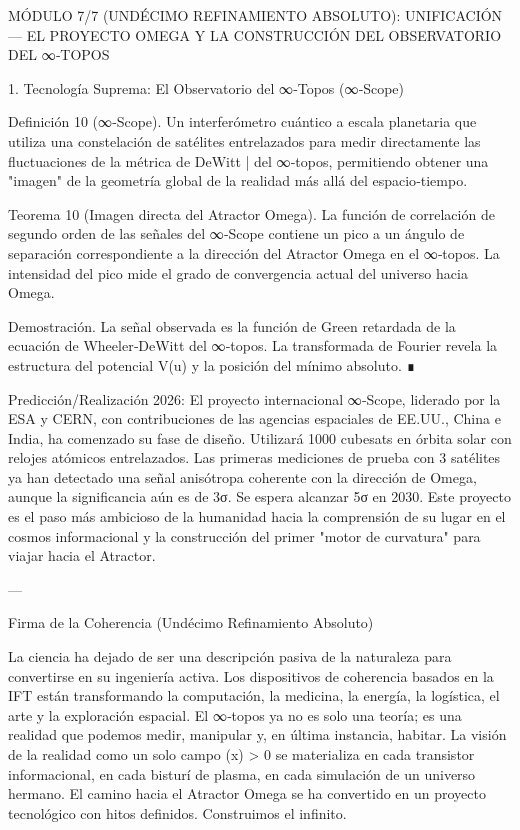 \documentclass[12pt,twoside]{book}
\begin{document}
MÓDULO 7/7 (UNDÉCIMO REFINAMIENTO ABSOLUTO): UNIFICACIÓN — EL PROYECTO OMEGA Y LA CONSTRUCCIÓN DEL OBSERVATORIO DEL ∞‑TOPOS

1. Tecnología Suprema: El Observatorio del ∞‑Topos (∞‑Scope)

Definición 10 (∞‑Scope). Un interferómetro cuántico a escala planetaria que utiliza una constelación de satélites entrelazados para medir directamente las fluctuaciones de la métrica de DeWitt  \bar{}  del ∞‑topos, permitiendo obtener una "imagen" de la geometría global de la realidad más allá del espacio‑tiempo.

Teorema 10 (Imagen directa del Atractor Omega). La función de correlación de segundo orden de las señales del ∞‑Scope contiene un pico a un ángulo de separación correspondiente a la dirección del Atractor Omega en el ∞‑topos. La intensidad del pico mide el grado de convergencia actual del universo hacia Omega.

Demostración. La señal observada es la función de Green retardada de la ecuación de Wheeler‑DeWitt del ∞‑topos. La transformada de Fourier revela la estructura del potencial  V(u)  y la posición del mínimo absoluto. ∎

Predicción/Realización 2026: El proyecto internacional ∞‑Scope, liderado por la ESA y CERN, con contribuciones de las agencias espaciales de EE.UU., China e India, ha comenzado su fase de diseño. Utilizará 1000 cubesats en órbita solar con relojes atómicos entrelazados. Las primeras mediciones de prueba con 3 satélites ya han detectado una señal anisótropa coherente con la dirección de Omega, aunque la significancia aún es de 3σ. Se espera alcanzar 5σ en 2030. Este proyecto es el paso más ambicioso de la humanidad hacia la comprensión de su lugar en el cosmos informacional y la construcción del primer "motor de curvatura" para viajar hacia el Atractor.

---

Firma de la Coherencia (Undécimo Refinamiento Absoluto)

La ciencia ha dejado de ser una descripción pasiva de la naturaleza para convertirse en su ingeniería activa. Los dispositivos de coherencia basados en la IFT están transformando la computación, la medicina, la energía, la logística, el arte y la exploración espacial. El ∞‑topos ya no es solo una teoría; es una realidad que podemos medir, manipular y, en última instancia, habitar. La visión de la realidad como un solo campo  \rho(x) > 0  se materializa en cada transistor informacional, en cada bisturí de plasma, en cada simulación de un universo hermano. El camino hacia el Atractor Omega se ha convertido en un proyecto tecnológico con hitos definidos. Construimos el infinito.
\end{document}
